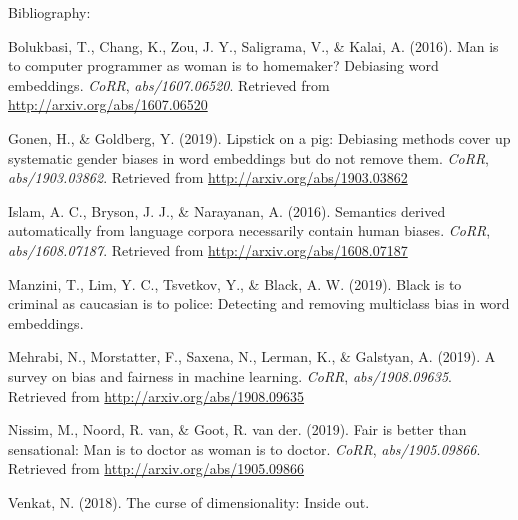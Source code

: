 \documentclass[12pt,]{book}
\begin{document}
Bibliography:

\hypertarget{refs}{}
\hypertarget{ref-Bolukbasi2016Man}{}
Bolukbasi, T., Chang, K., Zou, J. Y., Saligrama, V., \& Kalai, A.
(2016). Man is to computer programmer as woman is to homemaker?
Debiasing word embeddings. \emph{CoRR}, \emph{abs/1607.06520}. Retrieved
from \url{http://arxiv.org/abs/1607.06520}

\hypertarget{ref-Gonen2019Lipstick}{}
Gonen, H., \& Goldberg, Y. (2019). Lipstick on a pig: Debiasing methods
cover up systematic gender biases in word embeddings but do not remove
them. \emph{CoRR}, \emph{abs/1903.03862}. Retrieved from
\url{http://arxiv.org/abs/1903.03862}

\hypertarget{ref-Caliskan2017Semantics}{}
Islam, A. C., Bryson, J. J., \& Narayanan, A. (2016). Semantics derived
automatically from language corpora necessarily contain human biases.
\emph{CoRR}, \emph{abs/1608.07187}. Retrieved from
\url{http://arxiv.org/abs/1608.07187}

\hypertarget{ref-Manzini2019blackToCriminal}{}
Manzini, T., Lim, Y. C., Tsvetkov, Y., \& Black, A. W. (2019). Black is
to criminal as caucasian is to police: Detecting and removing multiclass
bias in word embeddings.

\hypertarget{ref-Mehrabi2019Survey}{}
Mehrabi, N., Morstatter, F., Saxena, N., Lerman, K., \& Galstyan, A.
(2019). A survey on bias and fairness in machine learning. \emph{CoRR},
\emph{abs/1908.09635}. Retrieved from
\url{http://arxiv.org/abs/1908.09635}

\hypertarget{ref-Nissim2019Fair}{}
Nissim, M., Noord, R. van, \& Goot, R. van der. (2019). Fair is better
than sensational: Man is to doctor as woman is to doctor. \emph{CoRR},
\emph{abs/1905.09866}. Retrieved from
\url{http://arxiv.org/abs/1905.09866}

\hypertarget{ref-Venkat2018Curse}{}
Venkat, N. (2018). The curse of dimensionality: Inside out.
\end{document}
